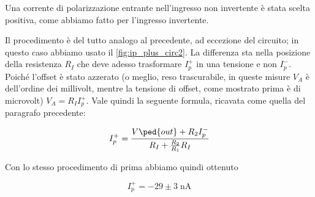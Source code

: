 Una corrente di polarizzazione entrante nell'ingresso non invertente è stata scelta positiva,
come abbiamo fatto per l'ingresso invertente. 

Il procedimento è del tutto analogo al precedente, ad eccezione del circuito; in questo caso
abbiamo usato il \ref{fig:ip_plus_circ2}. La differenza sta nella posizione della resistenza $R_I$
che deve adesso trasformare $I_p^+$ in una tensione e non $I_p^-$. Poiché l'offset è stato azzerato
(o meglio, reso trascurabile, in queste misure $V_A$ è dell'ordine dei millivolt, mentre la tensione
di offset, come mostrato prima è di microvolt) $V_A = R_I I_p^+$. Vale quindi la seguente formula, ricavata
come quella del paragrafo precedente:

\begin{equation}
    I_p^+ = \frac{V\ped{out} + R_2 I_p^-}{ R_I + \frac{R_2}{R_1} R_I}
\end{equation}

Con lo stesso procedimento di prima abbiamo quindi ottenuto

\begin{equation}
    I_p^+ = -29 \pm 3 \; \si{\nano\ampere}
\end{equation}
